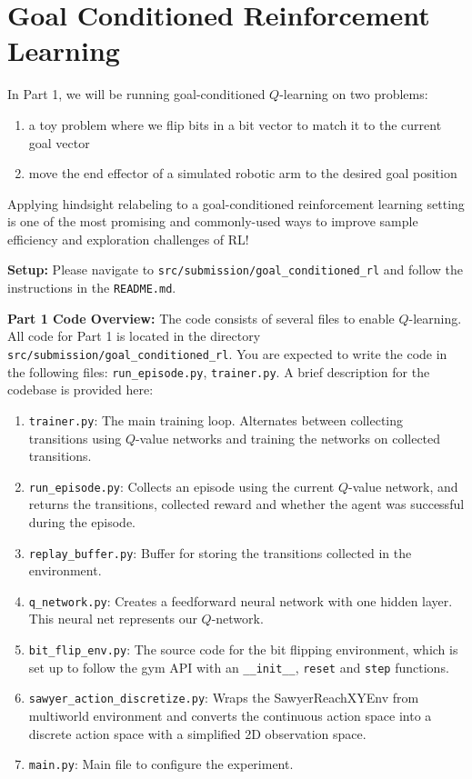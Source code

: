 \section{Goal Conditioned Reinforcement Learning}

In Part 1, we will be running goal-conditioned $Q$-learning on two problems:
\begin{enumerate}
\item a toy problem where we flip bits in a bit vector to match it to the current goal vector
\item move the end effector of a simulated robotic arm to the desired goal position
\end{enumerate}

Applying hindsight relabeling to a goal-conditioned reinforcement learning setting is one of the most promising and commonly-used ways to improve sample efficiency and exploration challenges of RL!

\textbf{Setup:} Please navigate to \texttt{src/submission/goal\_conditioned\_rl} and follow the instructions in the \texttt{README.md}.

\textbf{Part 1 Code Overview:} The code consists of several files to enable $Q$-learning. All code
for Part 1 is located in the directory \texttt{src/submission/goal\_conditioned\_rl}. You are expected to write
the code in the following files: \texttt{run\_episode.py}, \texttt{trainer.py}. A brief description for the
codebase is provided here:

\begin{enumerate}
    \item \texttt{trainer.py}: The main training loop. Alternates between collecting transitions
using $Q$-value networks and training the networks on collected transitions.
\item \texttt{run\_episode.py}: Collects an episode using the current $Q$-value network, and returns
the transitions, collected reward and whether the agent was successful during the
episode.
\item \texttt{replay\_buffer.py}: Buffer for storing the transitions collected in the environment.
\item  \texttt{q\_network.py}: Creates a feedforward neural network with one hidden layer. This
neural net represents our $Q$-network.
\item  \texttt{bit\_flip\_env.py}: The source code for the bit flipping environment, which is set up
to follow the gym API with an \texttt{\_\_init\_\_}, \texttt{reset} and \texttt{step} functions.
\item \texttt{sawyer\_action\_discretize.py}: Wraps the SawyerReachXYEnv from multiworld environment and converts the continuous action space into a discrete action space with
a simplified 2D observation space.
\item \texttt{main.py}: Main file to configure the experiment.
\end{enumerate}

